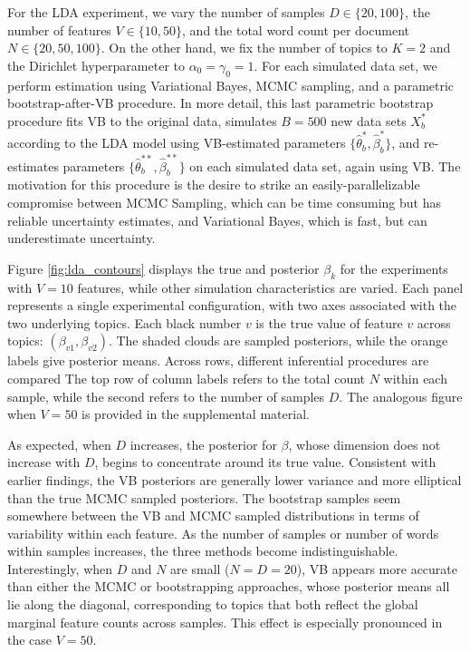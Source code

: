 \documentclass[oupdraft]{bio}
\begin{document}
For the LDA experiment, we vary the number of samples $D \in \{20, 100\}$, the
number of features $V \in \{10, 50\}$, and the total word count per document $N
\in \{20, 50, 100\}$. On the other hand, we fix the number of topics to $K = 2$
and the Dirichlet hyperparameter to $\alpha_{0} = \gamma_{0} = 1$. For each
simulated data set, we perform estimation using Variational Bayes, MCMC
sampling, and a parametric bootstrap-after-VB procedure. In more detail, this
last parametric bootstrap procedure fits VB to the original data, simulates $B =
500$ new data sets $X^{\ast}_{b}$ according to the LDA model using VB-estimated
parameters $\{\hat{\theta}^{\ast}_{b}, \hat{\beta}^{\ast}_{b}\}$, and
re-estimates parameters $\{\hat{\theta}^{\ast\ast}_{b},
\hat{\beta}^{\ast\ast}_{b}\}$ on each simulated data set, again using VB. The
motivation for this procedure is the desire to strike an easily-parallelizable
compromise between MCMC Sampling, which can be time consuming but has reliable
uncertainty estimates, and Variational Bayes, which is fast, but can
underestimate uncertainty.

Figure \ref{fig:lda_contours} displays the true and posterior $\beta_{k}$ for
the experiments with $V = 10$ features, while other simulation characteristics
are varied. Each panel represents a single experimental configuration, with two
axes associated with the two underlying topics. Each black number $v$ is the
true value of feature $v$ across topics: $\left(\beta_{v1}, \beta_{v2}\right)$.
The shaded clouds are sampled posteriors, while the orange labels give posterior
means. Across rows, different inferential procedures are compared The top row of
column labels refers to the total count $N$ within each sample, while the second
refers to the number of samples $D$. The analogous figure when $V = 50$ is
provided in the supplemental material.

As expected, when $D$ increases, the posterior for $\beta$, whose dimension does
not increase with $D$, begins to concentrate around its true value. Consistent
with earlier findings, the VB posteriors are generally lower variance and more
elliptical than the true MCMC sampled posteriors. The bootstrap samples seem
somewhere between the VB and MCMC sampled distributions in terms of variability
within each feature. As the number of samples or number of words within samples
increases, the three methods become indistinguishable. Interestingly, when $D$
and $N$ are small ($N = D = 20$), VB appears more accurate than either the MCMC
or bootstrapping approaches, whose posterior means all lie along the diagonal,
corresponding to topics that both reflect the global marginal feature counts
across samples. This effect is especially pronounced in the case $V = 50$.
\end{document}
